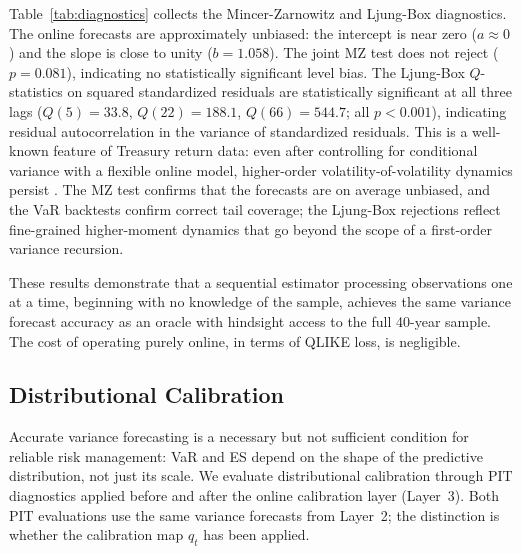 

Table~\ref{tab:diagnostics} collects the Mincer-Zarnowitz and Ljung-Box diagnostics. The
online forecasts are approximately unbiased: the intercept is near zero ($a \approx 0$) and
the slope is close to unity ($b = 1.058$). The joint MZ test does not reject ($p = 0.081$),
indicating no statistically significant level bias. The Ljung-Box $Q$-statistics on squared
standardized residuals are statistically significant at all three lags ($Q(5) = 33.8$,
$Q(22) = 188.1$, $Q(66) = 544.7$; all $p < 0.001$), indicating residual autocorrelation in
the variance of standardized residuals. This is a well-known feature of Treasury return data:
even after controlling for conditional variance with a flexible online model, higher-order
volatility-of-volatility dynamics persist \citep{andersen2003modeling}. The MZ test confirms that
the forecasts are on average unbiased, and the VaR backtests confirm correct tail coverage;
the Ljung-Box rejections reflect fine-grained higher-moment dynamics that go beyond the scope
of a first-order variance recursion.



These results demonstrate that a sequential estimator processing observations one at a time,
beginning with no knowledge of the sample, achieves the same variance forecast accuracy as an
oracle with hindsight access to the full 40-year sample. The cost of operating purely online,
in terms of QLIKE loss, is negligible.

\subsection{Distributional Calibration}\label{sec:pit_results}

Accurate variance forecasting is a necessary but not sufficient condition for reliable risk
management: VaR and ES depend on the shape of the predictive distribution, not just its scale.
We evaluate distributional calibration through PIT diagnostics applied before and after the
online calibration layer (Layer~3). Both PIT evaluations use the same variance forecasts from
Layer~2; the distinction is whether the calibration map $q_t$ has been applied.

